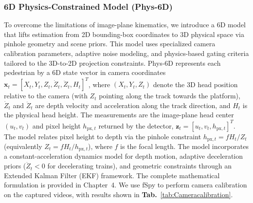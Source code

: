\subsubsection{6D Physics-Constrained Model (Phys-6D)}
To overcome the limitations of image-plane kinematics, we introduce a 6D model that lifts estimation from 2D bounding-box coordinates to 3D physical space via pinhole geometry and scene priors. This model uses specialized camera calibration parameters, adaptive noise modeling, and physics-based gating criteria tailored to the 3D-to-2D projection constraints.
Phys-6D represents each pedestrian by a 6D state vector in camera coordinates $\mathbf{x}_t = [X_t, Y_t, Z_t, \dot{Z}_t, \ddot{Z}_t, H_t]^T$, where $(X_t, Y_t, Z_t)$ denote the 3D head position relative to the camera (with $Z_t$ pointing along the track towards the platform), $\dot{Z}_t$ and $\ddot{Z}_t$ are depth velocity and acceleration along the track direction, and $H_t$ is the physical head height. The measurements are the image-plane head center $(u_t, v_t)$ and pixel height $h_{\text{px},t}$ returned by the detector, $\mathbf{z}_t = [u_t, v_t, h_{\text{px},t}]^T$. The model relates pixel height to depth via the pinhole constraint $h_{\text{px},t} = f H_t / Z_t$ (equivalently $Z_t = f H_t / h_{\text{px},t}$), where $f$ is the focal length. The model incorporates a constant-acceleration dynamics model for depth motion, adaptive deceleration priors ($\ddot{Z}_t < 0$ for decelerating trains), and geometric constraints through an Extended Kalman Filter (EKF) framework. The complete mathematical formulation is provided in Chapter~4. We use fSpy to perform camera calibration on the captured videos, with results shown in \textbf{Tab.}~\ref{tab:Cameracalibration}.

